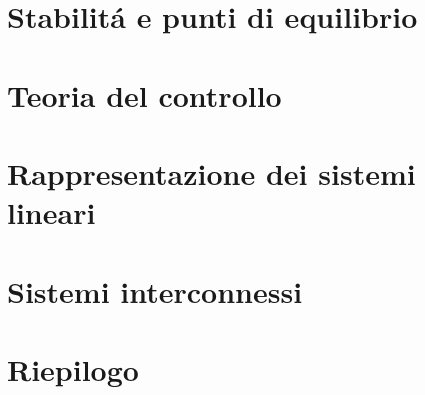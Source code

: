 \documentclass{report}
\begin{document}
	\chapter{Stabilit\'a e punti di equilibrio}
	\minitoc %
	\pagebreak
	
	\pagebreak
	\chapter{Teoria del controllo}
	\minitoc %
	\pagebreak
	
	
	
	
	
	
	\pagebreak
	\chapter{Rappresentazione dei sistemi lineari}
	\minitoc %
	\pagebreak
	
	
	
	\chapter{Sistemi interconnessi}
	\minitoc %
	\pagebreak
	
	\chapter{Riepilogo}
	\minitoc %
	\pagebreak
	
	
	
\end{document}
